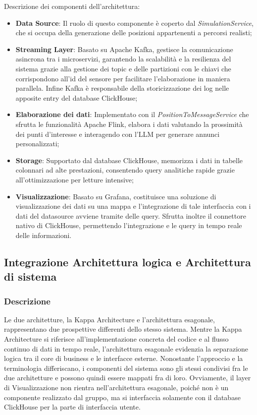 \documentclass[10pt]{article}
\begin{document}
Descrizione dei componenti dell'architettura:
\begin{itemize}
    \item \textbf{Data Source}: Il ruolo di questo componente è coperto dal \textit{SimulationService}, che si occupa della generazione delle posizioni appartenenti a percorsi realisti;
    \item \textbf{Streaming Layer}: Basato su Apache Kafka, gestisce la comunicazione asincrona tra i microservizi, garantendo la scalabilità e la resilienza del sistema grazie alla gestione dei topic e delle partizioni con le chiavi che corrispondono all'id del sensore per facilitare l'elaborazione in maniera parallela. Infine Kafka è responsabile della storicizzazione dei log nelle apposite entry del database ClickHouse;
    \item \textbf{Elaborazione dei dati}: Implementato con il \textit{PositionToMessageService} che sfrutta le funzionalità Apache Flink, elabora i dati valutando la prossimità dei punti d’interesse e interagendo con l’LLM per generare annunci personalizzati;
    \item \textbf{Storage}: Supportato dal database ClickHouse, memorizza i dati in tabelle colonnari ad alte prestazioni, consentendo query analitiche rapide grazie all’ottimizzazione per letture intensive;
    \item \textbf{Visualizzazione}: Basato su Grafana, costituisce una soluzione di visualizzazione dei dati su una mappa e l'integrazione di tale interfaccia con i dati del datasource avviene tramite delle query. Sfrutta inoltre il connettore nativo di ClickHouse, permettendo l'integrazione e le query in tempo reale delle informazioni.
\end{itemize}




\subsection{Integrazione Architettura logica e Architettura di sistema}
\subsubsection{Descrizione}
Le due architetture, la Kappa Architecture e l'architettura esagonale, rappresentano due prospettive differenti dello stesso sistema.
Mentre la Kappa Architecture si riferisce all’implementazione concreta del codice e al flusso continuo di dati in tempo reale, l’architettura esagonale evidenzia la separazione logica tra il core di business e le interfacce esterne.
Nonostante l'approccio e la terminologia differiscano, i componenti  del sistema sono gli stessi condivisi fra le due architetture e possono quindi essere mappati fra di loro.
Ovviamente, il layer di Visualizzazione non rientra nell'architettura esagonale, poiché non è un componente realizzato dal gruppo, ma si interfaccia solamente con il database ClickHouse per la parte di interfaccia utente.
\end{document}
